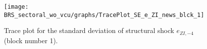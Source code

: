\begin{figure}[H]
\centering
  \texttt{[image: BRS\_sectoral\_wo\_vcu/graphs/TracePlot\_SE\_e\_ZI\_news\_blck\_1]}\\
    \caption{Trace plot for the standard deviation of structural shock ${e_{ZI,-4}}$ (block number 1).}
\end{figure}
